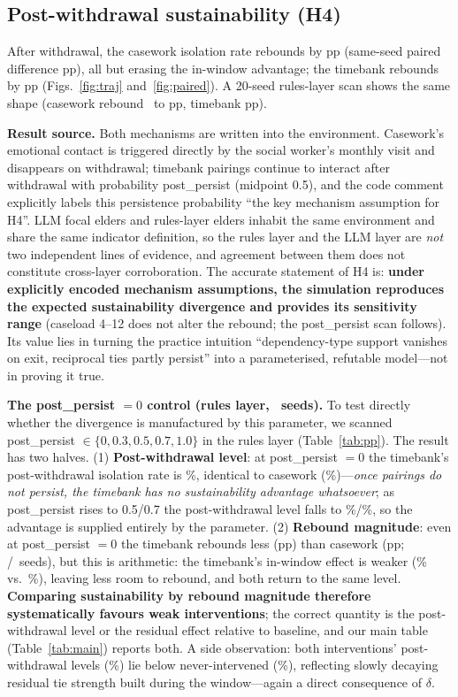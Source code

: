 \documentclass[10pt,twocolumn]{article}
\begin{document}
\subsection{Post-withdrawal sustainability (H4)}
After withdrawal, the casework isolation rate rebounds by \IsoRebCasework pp (same-seed paired difference \PairRebCasework pp), all but erasing the in-window advantage; the timebank rebounds by \IsoRebTimebank pp (Figs.~\ref{fig:traj} and~\ref{fig:paired}). A 20-seed rules-layer scan shows the same shape (casework rebound \RulesRebCwLo\ to \RulesRebCwHi pp, timebank \RulesRebTb pp).

\textbf{Result source.} Both mechanisms are written into the environment. Casework's emotional contact is triggered directly by the social worker's monthly visit and disappears on withdrawal; timebank pairings continue to interact after withdrawal with probability post\_persist (midpoint 0.5), and the code comment explicitly labels this persistence probability ``the key mechanism assumption for H4''. LLM focal elders and rules-layer elders inhabit the same environment and share the same indicator definition, so the rules layer and the LLM layer are \emph{not} two independent lines of evidence, and agreement between them does not constitute cross-layer corroboration. The accurate statement of H4 is: \textbf{under explicitly encoded mechanism assumptions, the simulation reproduces the expected sustainability divergence and provides its sensitivity range} (caseload 4--12 does not alter the rebound; the post\_persist scan follows). Its value lies in turning the practice intuition ``dependency-type support vanishes on exit, reciprocal ties partly persist'' into a parameterised, refutable model---not in proving it true.

\textbf{The post\_persist $=0$ control (rules layer, \PPSeeds\ seeds).} To test directly whether the divergence is manufactured by this parameter, we scanned post\_persist $\in\{0,0.3,0.5,0.7,1.0\}$ in the rules layer (Table~\ref{tab:pp}). The result has two halves. (1) \textbf{Post-withdrawal level}: at post\_persist $=0$ the timebank's post-withdrawal isolation rate is \PPPostTbZero\%, identical to casework (\PPPostCw\%)---\emph{once pairings do not persist, the timebank has no sustainability advantage whatsoever}; as post\_persist rises to 0.5/0.7 the post-withdrawal level falls to \PPPostTbMid\%/\PPPostTbHi\%, so the advantage is supplied entirely by the parameter. (2) \textbf{Rebound magnitude}: even at post\_persist $=0$ the timebank rebounds less (\PPRebTbZero pp) than casework (\PPRebCw pp; \PPLtCwZero/\PPSeeds\ seeds), but this is arithmetic: the timebank's in-window effect is weaker (\PPIvTb\% vs.\ \PPIvCw\%), leaving less room to rebound, and both return to the same level. \textbf{Comparing sustainability by rebound magnitude therefore systematically favours weak interventions}; the correct quantity is the post-withdrawal level or the residual effect relative to baseline, and our main table (Table~\ref{tab:main}) reports both. A side observation: both interventions' post-withdrawal levels (\PPPostCw\%) lie below never-intervened (\PPPostNone\%), reflecting slowly decaying residual tie strength built during the window---again a direct consequence of $\delta$.
\end{document}
